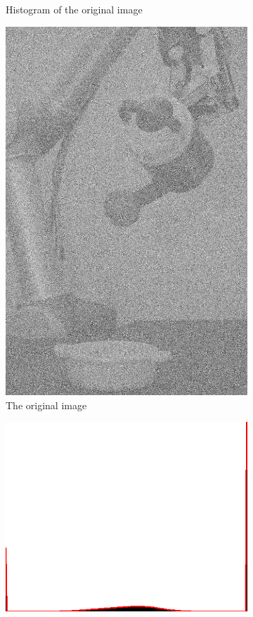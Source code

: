 \begin{figure}[H]
\begin{subfigure}[b]{0.16\textwidth}
        \caption{Histogram of the original image}
        \label{fig:img2_hist}
    \end{subfigure}
	 \begin{subfigure}[b]{0.16\textwidth}
        \includegraphics[width=\textwidth]{img2/src.png}
        \caption{The original image}
        \label{fig:img2_src}
    \end{subfigure}
    \begin{subfigure}[b]{0.16\textwidth}
        \includegraphics[width=\textwidth]{img2/hist.png}

\end{subfigure}
\end{figure}
